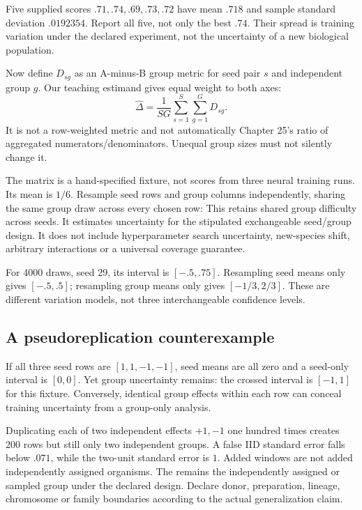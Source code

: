Five supplied scores $.71,.74,.69,.73,.72$ have mean $.718$ and sample standard
deviation $.0192354$. Report all five, not only the best $.74$.
Their spread is training variation under the declared experiment, not the
uncertainty of a new biological population.

Now define $D_{sg}$ as an A-minus-B group metric for seed pair $s$ and independent
group $g$. Our teaching estimand gives equal weight to both axes:
\[
 \hat\Delta=\frac1{SG}\sum_{s=1}^S\sum_{g=1}^G D_{sg}.
\]
It is not a row-weighted metric and not automatically Chapter 25's ratio of
aggregated numerators/denominators. Unequal group sizes must not silently change it.
\begin{center}\end{center}
The matrix is a hand-specified fixture, not scores from three neural training runs.
Its mean is $1/6$. Resample seed rows and group columns independently, sharing
the same group draw across every chosen row:
This  retains shared group difficulty across seeds.
It estimates uncertainty for the stipulated exchangeable seed/group design.
It does not include hyperparameter search uncertainty, new-species shift,
arbitrary interactions or a universal coverage guarantee.

For 4000 draws, seed 29, its interval is $[-.5,.75]$.
Resampling seed means only gives $[-.5,.5]$; resampling group means only gives
$[-1/3,2/3]$. These are different variation models, not three interchangeable
confidence levels.

\subsection{A pseudoreplication counterexample}
If all three seed rows are $[1,1,-1,-1]$, seed means are all zero and a seed-only
interval is $[0,0]$. Yet group uncertainty remains: the crossed interval is
$[-1,1]$ for this fixture. Conversely, identical group effects within each row
can conceal training uncertainty from a group-only analysis.

Duplicating each of two independent effects $+1,-1$ one hundred times creates
200 rows but still only two independent groups. A false IID standard error falls
below $.071$, while the two-unit standard error is $1$. Added windows are not
added independently assigned organisms. The  remains
the independently assigned or sampled group under the declared design. Declare donor, preparation, lineage,
chromosome or family boundaries according to the actual generalization claim.

